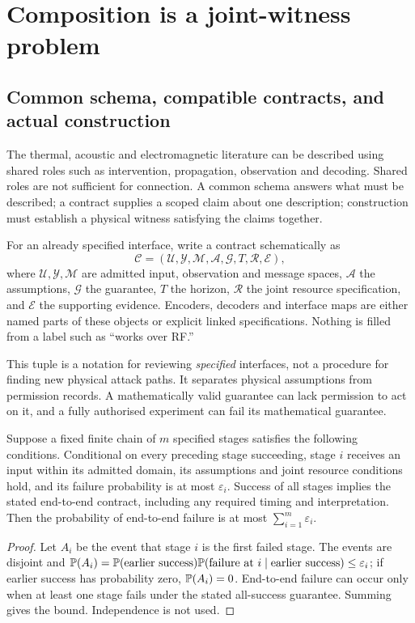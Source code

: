 \section{Composition is a joint-witness problem}\label{sec:composition}
\subsection{Common schema, compatible contracts, and actual construction}
The thermal, acoustic and electromagnetic literature can be described using shared roles such as intervention, propagation, observation and decoding. Shared roles are not sufficient for connection. A common schema answers what must be described; a contract supplies a scoped claim about one description; construction must establish a physical witness satisfying the claims together.

For an already specified interface, write a contract schematically as
\[
 \mathcal C=(\mathcal U,\mathcal Y,\mathcal M,\mathcal A,\mathcal G,
 T,\mathcal R,\mathcal E),
\]
where $\mathcal U,\mathcal Y,\mathcal M$ are admitted input, observation and message spaces, $\mathcal A$ the assumptions, $\mathcal G$ the guarantee, $T$ the horizon, $\mathcal R$ the joint resource specification, and $\mathcal E$ the supporting evidence. Encoders, decoders and interface maps are either named parts of these objects or explicit linked specifications. Nothing is filled from a label such as ``works over RF.''

This tuple is a notation for reviewing \emph{specified} interfaces, not a procedure for finding new physical attack paths. It separates physical assumptions from permission records. A mathematically valid guarantee can lack permission to act on it, and a fully authorised experiment can fail its mathematical guarantee.

\begin{proposition}\label{prop:serial}
Suppose a fixed finite chain of $m$ specified stages satisfies the following conditions. Conditional on every preceding stage succeeding, stage $i$ receives an input within its admitted domain, its assumptions and joint resource conditions hold, and its failure probability is at most $\varepsilon_i$. Success of all stages implies the stated end-to-end contract, including any required timing and interpretation. Then the probability of end-to-end failure is at most $\sum_{i=1}^m\varepsilon_i$.
\end{proposition}
\begin{proof}
Let $A_i$ be the event that stage $i$ is the first failed stage. The events are disjoint and
$\mathbb{P}(A_i)=\mathbb{P}(\text{earlier success})\mathbb{P}(\text{failure at }i\mid\text{earlier success})\leq\varepsilon_i$; if earlier success has probability zero, $\mathbb{P}(A_i)=0$. End-to-end failure can occur only when at least one stage fails under the stated all-success guarantee. Summing gives the bound. Independence is not used.
\end{proof}

